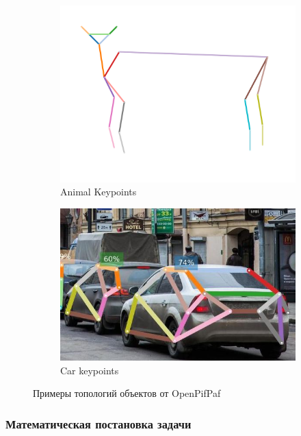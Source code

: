 \begin{figure}[h]
\begin{subfigure}[b]{0.48\textwidth}
	\centering
	\includegraphics[width=\textwidth]{./images/plugins_animalpose.png}
	\caption{Animal Keypoints}
\end{subfigure}
\begin{subfigure}[b]{0.48\textwidth}
	\centering
	\includegraphics[width=\textwidth]{./images/car_topology.jpg}
	\caption{Car keypoints}
\end{subfigure}
	\caption{Примеры топологий объектов от OpenPifPaf \cite{OpenPifPaf2021}}
	\label{fig:topology_exaples}
\end{figure}

\subsubsection*{Математическая постановка задачи}

